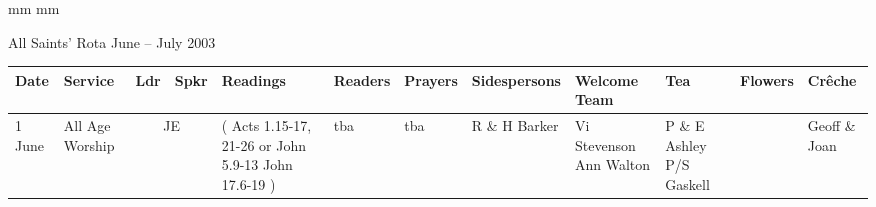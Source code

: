 \documentclass[10pt,a4paper]{article}
\newif\ifpdf
\begin{document}
\ifx\pdfoutput\undefined
\else
{} mm %
 mm
\fi
\begingroup
\ifpdf
\else
{}
\fi
\endgroup
\thispagestyle{empty}
\begin{center}
{\Large 
All Saints' Rota June -- July 2003}%
\vspace{1em}
{ \small
\begin{tabular}{|p{1.6cm}|p{1.4cm}|p{0.6cm}|p{0.6cm}|p{3.2cm}|p{2cm}|p{1.5cm}|p{2cm}|p{2.0cm}|p{2.4cm}
|p{1.6cm}|p{1.6cm}|}\hline
Date & Service
& Ldr & Spkr & Readings & Readers & Prayers &
Sidespersons & Welcome Team & Tea & Flowers & Cr\^{e}che \\ %
\hline\hline
1 June   &  All Age Worship &   \multicolumn{2}{|c|}{ JE }  &   
{\footnotesize (
Acts 1.15-17, 21-26 or
\linebreak 1 John 5.9-13
\linebreak John 17.6-19
) }
& 
tba & tba &
R \& H Barker  & Vi Stevenson Ann Walton & 
P \& E Ashley P/S Gaskell
&   &  Geoff \& Joan \\ \hline %


\end{tabular}}
\end{center}
\end{document}
